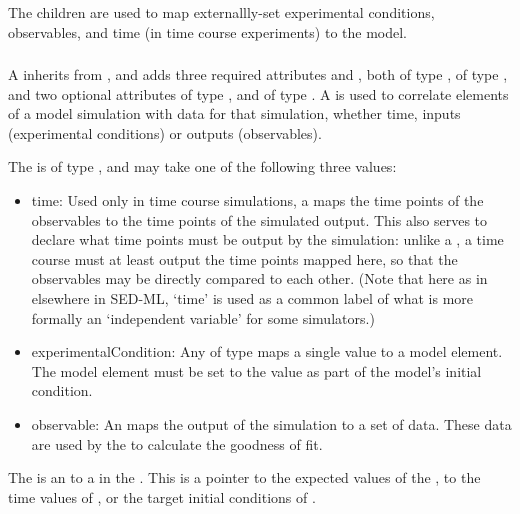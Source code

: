 The \FitMapping children are used to map externallly-set experimental conditions, observables, and time (in time course experiments) to the model.


\subsubsection{}
\label{class:fitMapping}

A \FitMapping inherits from \SedBase, and adds three required attributes  and , both of type \SIdRef,  of type \MappingType, and two optional attributes  of type , and  of type \SIdRef.  A \FitMapping is used to correlate elements of a model simulation with data for that simulation, whether time, inputs (experimental conditions) or outputs (observables).

The  is of type \MappingType, and may take one of the following three values:

\begin{itemize}
\item time:  Used only in time course simulations, a  \FitMapping maps the time points of the observables to the time points of the simulated output.  This also serves to declare what time points must be output by the simulation:  unlike a \UniformTimeCourse, a \FitExperiment time course must at least output the time points mapped here, so that the observables may be directly compared to each other.  (Note that here as in elsewhere in SED-ML, `time' is used as a common label of what is more formally an `independent variable' for some simulators.)
\item experimentalCondition:  Any \FitMapping of type  maps a single value to a model element.  The model element must be set to the value as part of the model's initial condition.
\item observable:  An  \FitMapping maps the output of the simulation to a set of data.  These data  are used by the \Objective to calculate the goodness of fit.
\end{itemize}

The  is an \SIdRef to a \DataSource in the \SedDocument.  This is a pointer to the expected values of the  \FitMappings, to the time values of  \FitMappings, or the target initial conditions of  \FitMappings.

